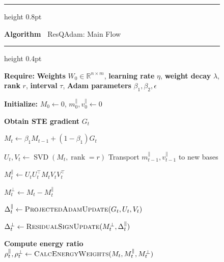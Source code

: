 \documentclass{article} %
\begin{document}
\begin{figure}
    \vspace{-0.14in}
    \centering

    \hrule height 0.8pt

    \label{alg:resqadam-main}
    
    \noindent
    \begin{minipage}[c][1.1\baselineskip][c]{\linewidth}
        \raggedright
        \textbf{Algorithm~\thealgorithm}  ResQAdam: Main Flow
    \end{minipage}
    
    \hrule height 0.4pt
    \vspace{4pt}

    \begin{minipage}{0.53\columnwidth}
    \small
    \begin{algorithmic}

\Statex \textbf{Require:} \textbf{Weights}
$W_0 \in \mathbb{R}^{n \times m}$,
\textbf{learning rate} $\eta$,
\textbf{weight decay} $\lambda$,
\textbf{rank} $r$,
\textbf{interval} $\tau$,
\textbf{Adam parameters} $\beta_1,\beta_2,\epsilon$

\Statex \textbf{Initialize:}
$M_0 \leftarrow 0$, \quad
$m_0^{\parallel},v_0^{\parallel}\leftarrow 0$

    \State \textbf{Obtain STE gradient} $G_t$

    \State $M_t \leftarrow
    \beta_1M_{t-1}+(1-\beta_1)G_t$

        \State $U_t,V_t\leftarrow
        \operatorname{SVD}(M_t,\operatorname{rank}=r)$
        \State Transport
        $m_{t-1}^{\parallel},v_{t-1}^{\parallel}$
        to new bases
    \EndIf

    \State $M_t^{\parallel}\leftarrow
    U_tU_t^\top M_tV_tV_t^\top$

    \State $M_t^{\perp}\leftarrow
    M_t-M_t^{\parallel}$

    \State $\Delta_t^{\parallel}\leftarrow
    \textsc{ProjectedAdamUpdate}
    (G_t,U_t,V_t)$

    \State $\Delta_t^{\perp}\leftarrow
    \textsc{ResidualSignUpdate}
    (M_t^{\perp},\Delta_t^{\parallel})$

    \State \textbf{Compute energy ratio}
    \Statex \hspace{\algorithmicindent}
    $\rho_t^{\parallel},\rho_t^{\perp}
    \leftarrow
    \textsc{CalcEnergyWeights}
    (M_t,M_t^{\parallel},M_t^{\perp})$


\end{algorithmic}
\end{minipage}
\end{figure}
\end{document}
